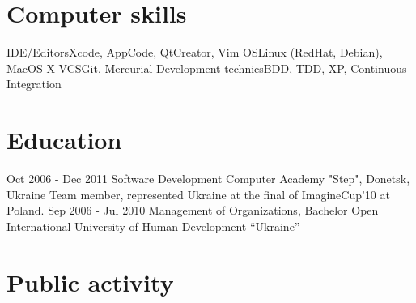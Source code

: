 \documentclass[11pt,a4paper]{moderncv}
\begin{document}
\section{Computer skills}
  \cvline
  {IDE/Editors}{Xcode, AppCode, QtCreator, Vim}
  \cvline
  {OS}{Linux (RedHat, Debian), MacOS X}
  \cvline
  {VCS}{Git, Mercurial}
  \cvline
  {Development technics}{BDD, TDD, XP, Continuous Integration}

\section{Education}
  \cventry
    {Oct 2006 - Dec 2011}
    {Software Development}
    {Computer Academy "Step", Donetsk, Ukraine}
    {}{}
    {Team member, represented Ukraine at the final of ImagineCup'10 at Poland.}
  \cventry
    {Sep 2006 - Jul 2010}
    {Management of Organizations, Bachelor}
    {Open International University of Human Development “Ukraine”}
    {}{}{}

\section{Public activity}
\end{document}

